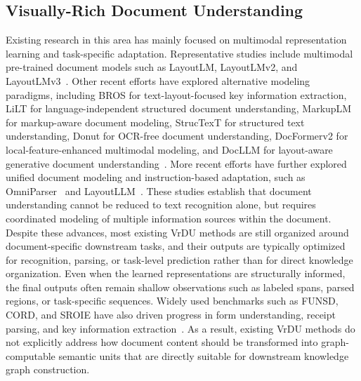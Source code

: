 \documentclass[pdflatex,twocolumn,iicol,sn-vancouver-num]{sn-jnl}%
\theoremstyle{thmstyleone}%
\theoremstyle{thmstyletwo}%
\theoremstyle{thmstylethree}%
\begin{document}
\subsection{Visually-Rich Document Understanding}
Existing research in this area has mainly focused on multimodal representation learning and task-specific adaptation. Representative studies include multimodal pre-trained document models such as LayoutLM, LayoutLMv2, and LayoutLMv3~\cite{xuLayoutLMPretrainingText2020,xuLayoutLMv2MultimodalPretraining2021,huangLayoutLMv3PretrainingDocument2022}. Other recent efforts have explored alternative modeling paradigms, including BROS for text-layout-focused key information extraction, LiLT for language-independent structured document understanding, MarkupLM for markup-aware document modeling, StrucTexT for structured text understanding, Donut for OCR-free document understanding, DocFormerv2 for local-feature-enhanced multimodal modeling, and DocLLM for layout-aware generative document understanding~\cite{hongBROSPretrainedLanguage2022,wangLiLTSimpleEffective2022,liMarkupLMPretrainingText2022,liStrucTexTStructuredText2021,kimOCRfreeDocumentUnderstanding2022,appalarajuDocFormerv2LocalFeatures2024,wangDocLLMLayoutawareGenerative2024}. More recent efforts have further explored unified document modeling and instruction-based adaptation, such as OmniParser~\cite{wanOmniParserUnifiedFramework2024b} and LayoutLLM~\cite{luoLayoutLLMLayoutInstruction2024a}. These studies establish that document understanding cannot be reduced to text recognition alone, but requires coordinated modeling of multiple information sources within the document. Despite these advances, most existing VrDU methods are still organized around document-specific downstream tasks, and their outputs are typically optimized for recognition, parsing, or task-level prediction rather than for direct knowledge organization. Even when the learned representations are structurally informed, the final outputs often remain shallow observations such as labeled spans, parsed regions, or task-specific sequences. Widely used benchmarks such as FUNSD, CORD, and SROIE have also driven progress in form understanding, receipt parsing, and key information extraction~\cite{jaumeFUNSDDatasetForm2019,parkCORDConsolidatedReceipt,huangICDAR2019CompetitionScanned2019}. As a result, existing VrDU methods do not explicitly address how document content should be transformed into graph-computable semantic units that are directly suitable for downstream knowledge graph construction.
\end{document}
